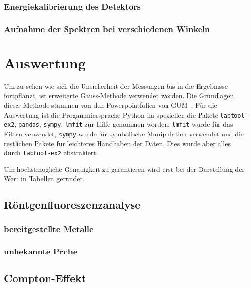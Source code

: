\documentclass[12pt,english,ngerman]{scrartcl}
\begin{document}
\subsubsection{Energiekalibrierung des Detektors}

\subsubsection{Aufnahme der Spektren bei verschiedenen Winkeln}





\section{Auswertung}\label{sec:auswertung}

Um zu sehen wie sich die Unsicherheit der Messungen bis in die Ergebnisse
fortpflanzt, ist erweiterte Gauss-Methode verwendet worden. Die Grundlagen
dieser Methode stammen von den Powerpointfolien von
GUM~\cite{wolfgang_kessel_isobipm-gum_2004}. Für die Auswertung ist die
Progammiersprache Python im speziellen die Pakete \verb#labtool-ex2#,
\verb#pandas#, \verb#sympy#, \verb#lmfit# zur Hilfe genommen worden.
\verb#lmfit# wurde für das Fitten verwendet, \verb#sympy# wurde für symbolische
Manipulation verwendet und die restlichen Pakete für leichteres Handhaben der
Daten. Dies wurde aber alles durch \verb#labtool-ex2# abstrahiert.

Um höchstmögliche Genauigkeit zu garantieren wird erst bei der Darstellung der
Wert in Tabellen gerundet.


\subsection{Röntgenfluoreszenzanalyse}

\subsubsection{bereitgestellte Metalle}


\subsubsection{unbekannte Probe}


\subsection{Compton-Effekt}
\end{document}
